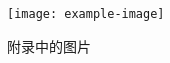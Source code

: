 \cleardoublepage
{
    

    \appendixsecmajornumbering


    \begin{figure}[htb]
        \centering
        \texttt{[image: example-image]}
        \caption{附录中的图片}
        \label{fig:test-appendix}
    \end{figure}

}